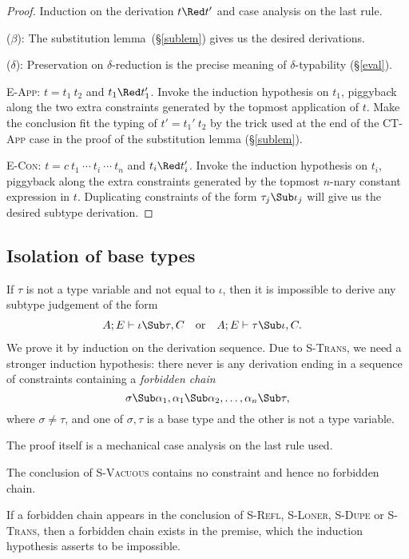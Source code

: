 \begin{proof}
Induction on the derivation $t\Red t'$ and case analysis on the
last rule.

\Case($\beta$): The substitution lemma~(\S\ref{sublem}) gives us
the desired derivations.

\Case($\delta$): Preservation on $\delta$-reduction is the
precise meaning of $\delta$-typability (\S\ref{eval}).

\Case\textsc{E-App}: $t=t_1~t_2$ and $t_1\Red t_1'$. Invoke the
induction hypothesis on $t_1$, piggyback along the two extra
constraints generated by the topmost application of $t$. Make
the conclusion fit the typing of $t'=t_1'~t_2$ by the trick used
at the end of the \textsc{CT-App} case in the proof of the
substitution lemma (\S\ref{sublem}).

\Case\textsc{E-Con}: $t=c~t_1~\cdots~t_i~\cdots~t_n$ and $t_i\Red
t_i'$. Invoke the induction hypothesis on $t_i$, piggyback along
the extra constraints generated by the topmost $n$-nary constant
expression in $t$. Duplicating constraints of the form
$\tau_j\Sub\iota_j$ will give us the desired subtype derivation.
\end{proof}

\subsection{Isolation of base types}
\label{isotypes}
If $\tau$ is not a type variable and not equal to $\iota$, then
it is impossible to derive any subtype judgement of the form
\begin{align*}
A;E&\vdash \iota\Sub\tau,C&
&\mbox{or}&
A;E&\vdash\tau\Sub\iota,C.
\end{align*}
We prove it by induction on the derivation sequence. Due to
\textsc{S-Trans}, we need a stronger induction hypothesis: there
never is any derivation ending in a sequence of constraints
containing a \emph{forbidden chain}
\[
\sigma\Sub\alpha_1,\alpha_1\Sub\alpha_2,\ldots,\alpha_n\Sub\tau,
\]
where $\sigma\neq\tau$, and one of $\sigma,\tau$ is a base type
and the other is not a type variable.

The proof itself is a mechanical case analysis on the last rule
used.

The conclusion of \textsc{S-Vacuous} contains no constraint and
hence no forbidden chain.

If a forbidden chain appears in the conclusion of \textsc{S-Refl},
\textsc{S-Loner}, \textsc{S-Dupe} or \textsc{S-Trans}, then a
forbidden chain exists in the premise, which the induction
hypothesis asserts to be impossible.

